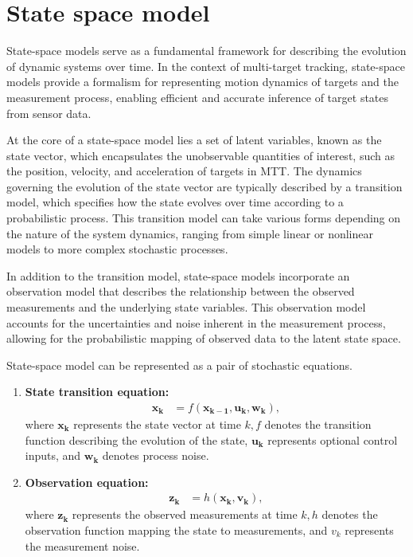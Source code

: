     \section{State space model}
\label{sec:stateSpaceModel}
State-space models serve as a fundamental framework for describing the evolution of dynamic systems over time. In the context of multi-target tracking, state-space models provide a formalism for representing motion dynamics of targets and the measurement process, enabling efficient and accurate inference of target states from sensor data.

At the core of a state-space model lies a set of latent variables, known as the state vector, which encapsulates the unobservable quantities of interest, such as the position, velocity, and acceleration of targets in MTT. The dynamics governing the evolution of the state vector are typically described by a transition model, which specifies how the state evolves over time according to a probabilistic process. This transition model can take various forms depending on the nature of the system dynamics, ranging from simple linear or nonlinear models to more complex stochastic processes.

In addition to the transition model, state-space models incorporate an observation model that describes the relationship between the observed measurements and the underlying state variables. This observation model accounts for the uncertainties and noise inherent in the measurement process, allowing for the probabilistic mapping of observed data to the latent state space.

State-space model can be represented as a pair of stochastic equations.
\begin{enumerate}
    \item \textbf{State transition equation:}
        \begin{align}
                  \mathbf{x_k} &= f(\mathbf{x_{k-1}}, \mathbf{u_k}, \mathbf{w_k}), \label{eq:state_space_model_state}
        \end{align}
        where $\mathbf{x_k}$ represents the state vector at time $k, f$ denotes the transition function describing the
        evolution of the state, $\mathbf{u_k}$ represents optional control inputs, and $\mathbf{w_k}$ denotes process
    noise.
    \item \textbf{Observation equation:}
        \begin{align}
            \mathbf{z_k} &= h(\mathbf{x_{k}}, \mathbf{v_k}), \label{eq:state_space_model_observation}
        \end{align}
        where $\mathbf{z_k}$ represents the observed measurements at time $k, h$ denotes the observation function
    mapping the
    state to measurements, and $v_k$ represents the measurement noise.
\end{enumerate}

